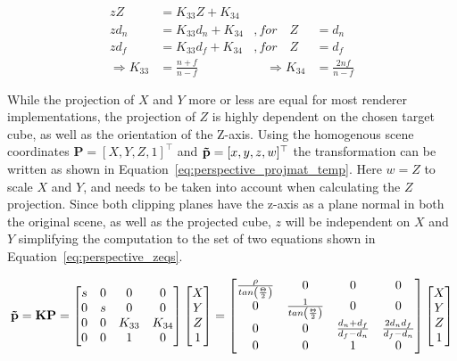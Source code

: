 \begin{equation}
    \begin{aligned}
        zZ &= K_{33} Z + K_{34} &\\
        zd_n &= K_{33} d_n + K_{34} &, for \quad Z &= d_n \\
        zd_f &= K_{33} d_f + K_{34} &, for \quad Z &= d_f \\
        \Rightarrow K_{33} &= \frac{n+f}{n-f} & \quad \Rightarrow K_{34} &= \frac{2nf}{n-f}
    \end{aligned}
    \label{eq:perspective_zeqs}
\end{equation}


While the projection of $X$ and $Y$ more or less are equal for most renderer implementations, the projection of $Z$ is highly dependent on the chosen target cube, as well as the orientation of the Z-axis. Using the homogenous scene coordinates $\mathbf{P} = [X,Y,Z,1]^\top$ and $\mathbf{\Tilde{p}} = [x,y,z,w]^\top$ the transformation can be written as shown in Equation~\eqref{eq:perspective_projmat_temp}. Here $w = Z$ to scale $X$ and $Y$, and needs to be taken into account when calculating the $Z$ projection. Since both clipping planes have the z-axis as a plane normal in both the original scene, as well as the projected cube, $z$ will be independent on $X$ and $Y$ simplifying the computation to the set of two equations shown in Equation~\eqref{eq:perspective_zeqs}.


\begin{align}
    \mathbf{\Tilde{p}} = \mathbf{K}\mathbf{P} = \begin{bmatrix}
        s & 0 & 0 & 0 \\
        0 & s & 0 & 0 \\
        0 & 0 & K_{33} & K_{34} \\
        0 & 0 & 1 & 0
    \end{bmatrix} \begin{bmatrix}
        X \\ Y \\ Z \\ 1
    \end{bmatrix} = \begin{bmatrix}
        \frac{\rho}{tan\left(\frac{\Theta}{2}\right)}& 0 & 0 & 0 \\
        0 & \frac{1}{tan\left(\frac{\Theta}{2}\right)}& 0 & 0 \\
        0 & 0 & \frac{d_n+d_f}{d_f-d_n} & \frac{2d_n d_f}{d_f-d_n} \\
        0 & 0 & 1 & 0
    \end{bmatrix} \begin{bmatrix}
        X \\ Y \\ Z \\ 1
    \end{bmatrix}
    \label{eq:perspective_projmat_temp}
\end{align}

